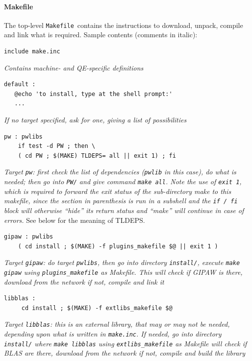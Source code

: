 \documentclass[12pt,a4paper]{article}
\def\qe{QE}
\def\Makefile{\texttt{Makefile}}
\begin{document}
\paragraph{Makefile}
The top-level \Makefile\ contains the instructions to download,
unpack, compile and link what is required. Sample contents
(comments in italic):
\begin{verbatim}
include make.inc
\end{verbatim}
{\em Contains machine- and \qe-specific definitions}
\begin{verbatim}
default :
   @echo 'to install, type at the shell prompt:'
   ...
\end{verbatim}
{\em If no target specified, ask for one, giving a list of possibilities}
\begin{verbatim}
pw : pwlibs
    if test -d PW ; then \
    ( cd PW ; $(MAKE) TLDEPS= all || exit 1) ; fi

\end{verbatim}
{\em Target {\tt pw}: first check the list of dependencies ({\tt pwlib} in this case), 
  do what is needed; then go into {\tt PW/} and give command
  {\tt make all}. Note the use of {\tt exit 1}, which is required to forward
the exit status of the sub-directory make to this makefile, since the section
in parenthesis is run in a subshell and the {\tt if / fi} block will otherwise
``hide'' its return status and ``make'' will continue in case of errors. }
  See below for the meaning of TLDEPS.
\begin{verbatim}
gipaw : pwlibs
	( cd install ; $(MAKE) -f plugins_makefile $@ || exit 1 )
\end{verbatim}
{\em Target {\tt gipaw}: do target {\tt pwlibs}, then go into directory
{\tt install/}, execute {\tt make gipaw} using {\tt plugins\_makefile}
as Makefile. This will check if GIPAW is there, download from the network
if not, compile and link it}
\begin{verbatim}
libblas :
     cd install ; $(MAKE) -f extlibs_makefile $@
\end{verbatim}
{\em Target {\tt libblas}: this is an external library, that may or may
not be needed, depending upon what is written in {\tt make.inc}. If
needed, go into directory {\tt install/} where {\tt make libblas} using
{\tt extlibs\_makefile} as Makefile will check if BLAS are there, download
from the network if not,
compile and build the library}
\end{document}
